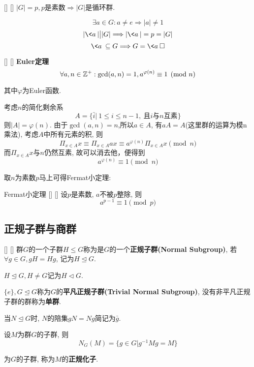 \documentclass[UTF8]{ctexart}
\begin{document}
		\begin{ppt}
            []
            {}
            []
            []
			$|G|=p, p$是素数$\Longrightarrow |G|$是循环群. 
		\end{ppt}

		\begin{prf} 
			\[\exists a\in G: a\neq e\Longrightarrow |a|\neq 1\]
			\[|\<a\>|{\big|}|G|\Longrightarrow |\<a\>|=p=|G|\]
			\[\<a\>\subseteq G\Longrightarrow G=\<a\>\square\]
	\end{prf}
 
		\begin{thm}
            []
            {}
            []
            []
			\textbf{Euler定理}
			\[\forall a,n\in\mathbb{Z}^{+}: {\rm gcd}(a,n)=1, a^{\varphi(n)}\equiv 1\pmod n\]
			
			其中$\varphi$为Euler函数. 
		\end{thm}	
		
		\begin{prf}
			
			考虑$n$的简化剩余系
			\[A=\{\bar{i}|\ 1\leq i\leq n-1,\ \text{且}i\text{与}n\text{互素}\}\]
                则$|A|=\varphi(n)$. 由于$\gcd(a,n)=n$,所以$a \in A$, 有$aA=A$(这里群的运算为模n乘法), 考虑$A$中所有元素的积, 则
                \[\Pi_{x\in A}x\equiv\Pi_{x\in A}ax\equiv a^{\varphi(n)}\Pi_{x\in A}x \pmod n\]
                而$\Pi_{x\in A}x$与$n$仍然互素, 故可以消去他，便得到
                \[a^{\varphi(n)}\equiv 1\pmod n\]
	\end{prf}
        
    取$n$为素数$p$马上可得Fermat小定理:
		
    \begin{thm}
        []
        {Fermat小定理}
        []
        []
        设$p$是素数, $a$不被$p$整除, 则
        \[a^{p-1}\equiv1 \pmod p\]
			
    \end{thm}	
        
			
			
	\subsection{正规子群与商群}
	
		\begin{dfn}
            []
            {}
            []
            []
			群$G$的一个子群$H\leq G$称为是$G$的一个\textbf{正规子群(Normal Subgroup)}, 若$\forall g\in G, gH=Hg$, 记为$H\trianglelefteq G$. 
			
			$H\trianglelefteq G, H\neq G$记为$H\triangleleft G$. 
			
			$\{e\},G\trianglelefteq G$称为$G$的\textbf{平凡正规子群(Trivial Normal Subgroup)},
                没有非平凡正规子群的群称为\textbf{单群}.
			
			当$N\trianglelefteq G$时, $N$的陪集$gN=Ng$简记为$\bar{g}$. 

                设$M$为群$G$的子群, 则
                \[N_G(M)=\{g\in G| g^{-1}Mg=M\}\]

                为$G$的子群, 称为$M$的\textbf{正规化子}.
		\end{dfn}
		
\end{document}

